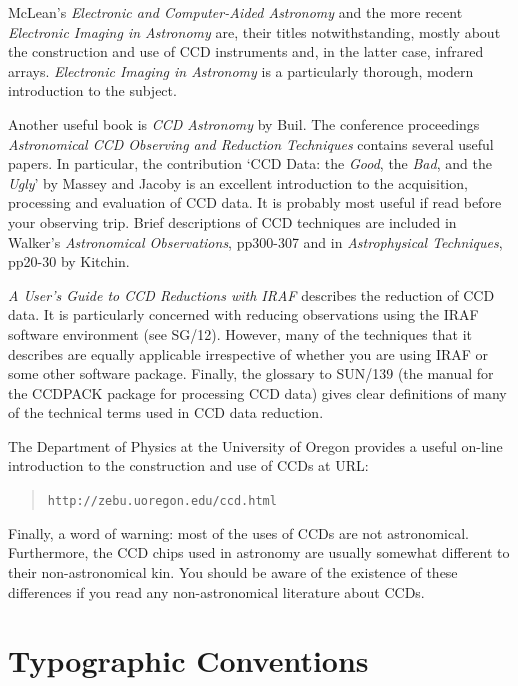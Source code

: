 \documentclass[twoside,11pt]{article}
\newcommand{\htmladdnormallink}[2]{#1}
\newcommand{\xref}[3]{#1}
\newcommand{\xlabel}[1]{}
\begin{document}
McLean's {\it Electronic and Computer-Aided Astronomy}\/\cite{MCLEAN89}
and the more recent {\it Electronic Imaging in Astronomy}\/\cite{MCLEAN97}
are, their titles notwithstanding, mostly about the construction and use of
CCD instruments and, in the latter case, infrared arrays.  {\it Electronic
Imaging in Astronomy}\/ is a particularly thorough, modern introduction to
the subject.

Another useful book is {\it CCD Astronomy}\/ by Buil\cite{BUIL91}.  The
conference proceedings {\it Astronomical CCD Observing and Reduction
Techniques}\/\cite{HOWELL92} contains several useful papers.  In
particular, the contribution `CCD Data: the {\it Good}, the {\it Bad},
and the {\it Ugly}' by Massey and Jacoby\cite{MASSEY92} is an excellent
introduction to the acquisition, processing and evaluation of CCD data.
It is probably most useful if read before your observing trip.  Brief
descriptions of CCD techniques are included in Walker's {\it Astronomical
Observations}\/\cite{WALKER87}, pp300-307 and in {\it Astrophysical
Techniques}\/\cite{KITCHIN98}, pp20-30 by Kitchin.

{\it A User's Guide to CCD Reductions with IRAF}\/\cite{MASSEY97}
describes the reduction of CCD data.  It is particularly concerned with
reducing observations using the IRAF software environment (see
\xref{SG/12}{sg12}{}\/\cite{SG12}).  However, many of the techniques
that it describes are equally applicable irrespective of whether you are
using IRAF or some other software package.  Finally, the
\xref{glossary}{sun139}{glossary} to \xref{SUN/139}{sun139}{}\/\cite{SUN139}
(the manual for the CCDPACK package for processing CCD data) gives clear
definitions of many of the technical terms used in CCD data reduction.

The Department of Physics at the University of Oregon provides a useful
on-line introduction to the construction and use of CCDs at URL:

\begin{quote}
\htmladdnormallink{ {\tt http://zebu.uoregon.edu/ccd.html}}
{http://zebu.uoregon.edu/ccd.html}
\end{quote}

Finally, a word of warning: most of the uses of CCDs are not astronomical.
Furthermore, the CCD chips used in astronomy are usually somewhat different
to their non-astronomical kin.  You should be aware of the existence of
these differences if you read any non-astronomical literature about CCDs.


\section{\xlabel{TYPO}\label{TYPO}Typographic Conventions}
\end{document}
